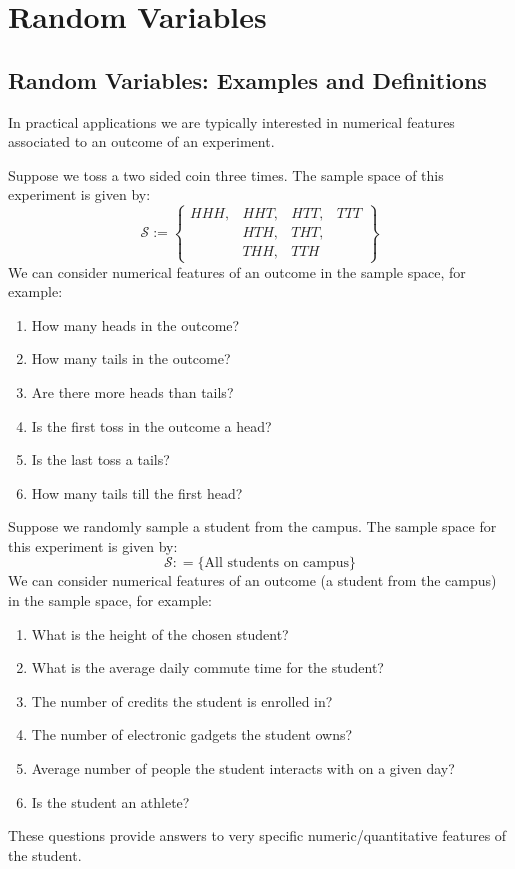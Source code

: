 \chapter[Random Variables]{Random Variables}
\section{Random Variables: Examples and Definitions}
In practical applications we are typically interested in numerical features associated to an outcome of an experiment. 

\begin{ex}
    Suppose we toss a two sided coin three times. The sample space of this experiment is given by: 
    $$\mathcal{S} := \begin{Bmatrix}
         HHH, & HHT, & HTT, &TTT  \\
            & HTH, & THT,& \\
            &THH, & TTH&
    \end{Bmatrix}
    $$
    We can consider numerical features of an outcome in the sample space, for example:
    \begin{enumerate}
        \item How many heads in the outcome?
        \item How many tails in the outcome?
        \item Are there more heads than tails?
        \item Is the first toss in the outcome a head?
        \item Is the last toss a tails?
        \item How many tails till the first head?
    \end{enumerate}
\end{ex}

\begin{ex}
    Suppose we randomly sample a student from the campus. The sample space for this experiment is given by:
    $$\mathcal{S} : = \{ \text{All students on campus}\}$$
    We can consider numerical features of an outcome (a student from the campus) in the sample space, for example:
    \begin{enumerate}
        \item What is the height of the chosen student?
        \item What is the average daily commute time for the student?
        \item The number of credits the student is enrolled in?
        \item The number of electronic gadgets the student owns?
        \item Average number of people the student interacts with on a given day?
        \item Is the student an athlete?
    \end{enumerate}
\end{ex}
These questions provide answers to very specific numeric/quantitative features of the student. 


